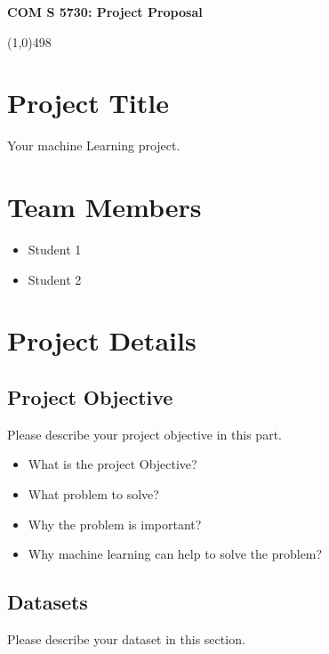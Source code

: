 \documentclass[11pt]{article}
\begin{document}
\begin{center}
{\Large \textbf{COM S 5730: Project Proposal}}\\
\end{center}

\linethickness{1mm}\line(1,0){498}



\section{Project Title}

Your machine Learning project.

\section{Team Members}

\begin{itemize}
  \item Student 1
  \item Student 2
\end{itemize}

\section{Project Details}

\subsection{Project Objective}

Please describe your project objective in this part.

\begin{itemize}
  \item What is the project Objective?
  \item What problem to solve?
  \item Why the problem is important?
  \item Why machine learning can help to solve the problem?
\end{itemize}

\subsection{Datasets}

Please describe your dataset in this section.
\end{document}
